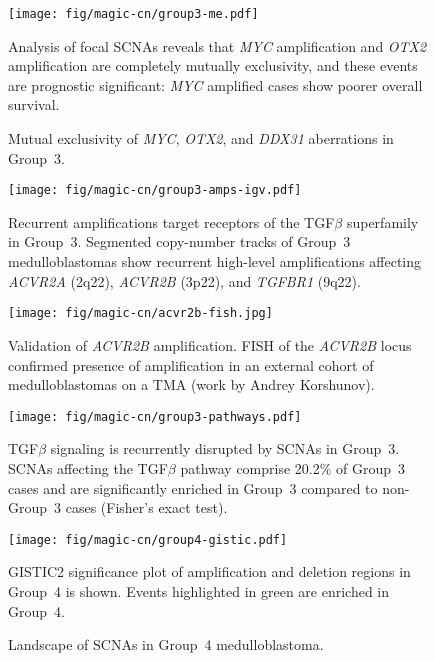 \documentclass[11pt,letterpaper]{article}
\theoremstyle{definition}
\begin{document}
\clearpage

\begin{figure}[h]
	\begin{center}
		\texttt{[image: fig/magic-cn/group3-me.pdf]}
	\end{center}
	\caption{Mutual exclusivity of \emph{MYC}, \emph{OTX2}, and \emph{DDX31} aberrations in Group~3.}
	Analysis of focal SCNAs reveals that \emph{MYC} amplification and \emph{OTX2} amplification are completely mutually exclusivity, and these events are prognostic significant: \emph{MYC} amplified cases show poorer overall survival.
	\label{fig:group3-me}
\end{figure}

\begin{SCfigure}
	\centering
	\texttt{[image: fig/magic-cn/group3-amps-igv.pdf]}
	\caption{Recurrent amplifications target receptors of the TGF$\beta$ superfamily in Group~3.
		Segmented copy-number tracks of Group~3 medulloblastomas show recurrent high-level amplifications affecting \emph{ACVR2A} (2q22), \emph{ACVR2B} (3p22), and \emph{TGFBR1} (9q22).}
	\label{fig:group3-amps-igv}
\end{SCfigure}

\begin{SCfigure}[3.0]
	\centering
	\texttt{[image: fig/magic-cn/acvr2b-fish.jpg]}
	\caption{Validation of \emph{ACVR2B} amplification.
	FISH of the \emph{ACVR2B} locus confirmed presence of amplification in an external cohort of medulloblastomas on a TMA (work by Andrey Korshunov).}
	\label{fig:acvr2b-fish}
\end{SCfigure}

\begin{SCfigure}
	\centering
	\texttt{[image: fig/magic-cn/group3-pathways.pdf]}
	\caption{TGF$\beta$ signaling is recurrently disrupted by SCNAs in Group~3.
SCNAs affecting the TGF$\beta$ pathway comprise 20.2\% of Group~3 cases and are significantly enriched in Group~3 compared to non-Group~3 cases (Fisher’s exact test).}
	\label{fig:group3-pathways}
\end{SCfigure}

\clearpage

\begin{figure}[h]
	\begin{center}
		\texttt{[image: fig/magic-cn/group4-gistic.pdf]}
	\end{center}
	\caption{Landscape of SCNAs in Group~4 medulloblastoma.}
	GISTIC2 significance plot of amplification and deletion regions in Group~4 is shown. Events highlighted in green are enriched in Group~4.
	\label{fig:group4-gistic}
\end{figure}
\end{document}
